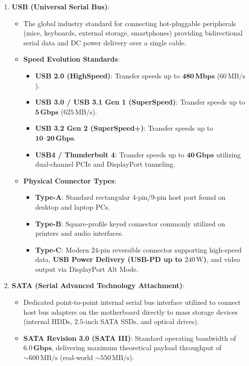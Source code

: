\begin{enumerate}[leftmargin=1.5em]
    \item \textbf{USB (Universal Serial Bus)}:
    \begin{itemize}
        \item The global industry standard for connecting hot-pluggable peripherals (mice, keyboards, external storage, smartphones) providing bidirectional serial data and DC power delivery over a single cable.
        \item \textbf{Speed Evolution Standards}:
        \begin{itemize}
            \item \textbf{USB 2.0 (HighSpeed)}: Transfer speeds up to $\mathbf{480\,\text{Mbps}}$ ($60\,\text{MB/s}$).
            \item \textbf{USB 3.0 / USB 3.1 Gen 1 (SuperSpeed)}: Transfer speeds up to $\mathbf{5\,\text{Gbps}}$ ($625\,\text{MB/s}$).
            \item \textbf{USB 3.2 Gen 2 (SuperSpeed+)}: Transfer speeds up to $\mathbf{10\text{--}20\,\text{Gbps}}$.
            \item \textbf{USB4 / Thunderbolt 4}: Transfer speeds up to $\mathbf{40\,\text{Gbps}}$ utilizing dual-channel PCIe and DisplayPort tunneling.
        \end{itemize}
        \item \textbf{Physical Connector Types}:
        \begin{itemize}
            \item \textbf{Type-A}: Standard rectangular 4-pin/9-pin host port found on desktop and laptop PCs.
            \item \textbf{Type-B}: Square-profile keyed connector commonly utilized on printers and audio interfaces.
            \item \textbf{Type-C}: Modern 24-pin reversible connector supporting high-speed data, \textbf{USB Power Delivery (USB-PD up to $240\,\text{W}$)}, and video output via DisplayPort Alt Mode.
        \end{itemize}
    \end{itemize}

    \item \textbf{SATA (Serial Advanced Technology Attachment)}:
    \begin{itemize}
        \item Dedicated point-to-point internal serial bus interface utilized to connect host bus adapters on the motherboard directly to mass storage devices (internal HDDs, $2.5\text{-inch}$ SATA SSDs, and optical drives).
        \item \textbf{SATA Revision 3.0 (SATA III)}: Standard operating bandwidth of $\mathbf{6.0\,\text{Gbps}}$, delivering maximum theoretical payload throughput of $\sim 600\,\text{MB/s}$ (real-world $\sim 550\,\text{MB/s}$).
    \end{itemize}


\end{enumerate}
